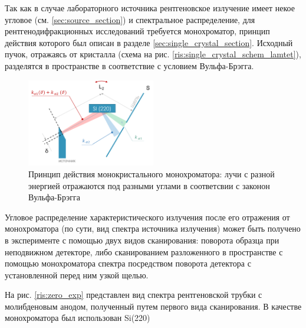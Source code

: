 Так как в случае лабораторного источника рентгеновское излучение имеет
некое угловое  (см. \ref{sec:source_section}) и спектральное распределение,
для рентгенодифракционных исследований требуется монохроматор, принцип действия которого
был описан в разделе \ref{sec:single_crystal_section}. Исходный пучок, отражаясь от
кристалла (схема на рис. \ref{ris:single_crystal_schem_lamtet}), разделятся в пространстве
в соответствие с условием Вульфа-Брэгга.

\begin{figure}[H]
  \centering
  \includegraphics[width=0.5\textwidth]{images/single_crystal_schem_exp.png}
  \caption{Принцип действия монокристального монохроматора: лучи с разной энергией отражаются под разными углами
  в соответсвии с законон Вульфа-Брэгга}
  \label{ris:single_crystal_schem_exp}
\end{figure}
%
Угловое распределение характеристического излучения после его отражения от монохроматора (по сути,
вид спектра источника излучения) может быть получено в эксперименте с помощью двух видов сканирования:
поворота образца при неподвижном детекторе, либо сканированием разложенного в пространстве
с помощью монохроматора спектра посредством поворота детектора с установленной перед ним узкой щелью.

На рис. \ref{ris:zero_exp} представлен вид спектра рентгеновской трубки с молибденовым анодом,
полученный путем первого вида сканирования. В качестве монохроматора был использован Si(220)

